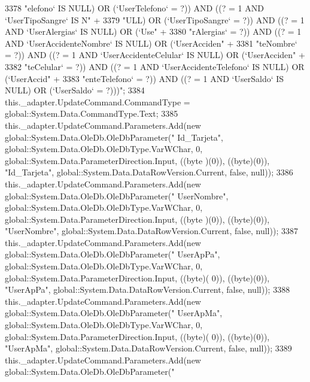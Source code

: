 \begin{DoxyCode}
3378                 \textcolor{stringliteral}{"elefono` IS NULL) OR (`UserTelefono` = ?)) AND ((? = 1 AND `UserTipoSangre` IS N"} +
3379                 \textcolor{stringliteral}{"ULL) OR (`UserTipoSangre` = ?)) AND ((? = 1 AND `UserAlergias` IS NULL) OR (`Use"} +
3380                 \textcolor{stringliteral}{"rAlergias` = ?)) AND ((? = 1 AND `UserAccidenteNombre` IS NULL) OR (`UserAcciden"} +
3381                 \textcolor{stringliteral}{"teNombre` = ?)) AND ((? = 1 AND `UserAccidenteCelular` IS NULL) OR (`UserAcciden"} +
3382                 \textcolor{stringliteral}{"teCelular` = ?)) AND ((? = 1 AND `UserAccidenteTelefono` IS NULL) OR (`UserAccid"} +
3383                 \textcolor{stringliteral}{"enteTelefono` = ?)) AND ((? = 1 AND `UserSaldo` IS NULL) OR (`UserSaldo` = ?)))"};
3384             this.\_adapter.UpdateCommand.CommandType = global::System.Data.CommandType.Text;
3385             this.\_adapter.UpdateCommand.Parameters.Add(\textcolor{keyword}{new} global::System.Data.OleDb.OleDbParameter(\textcolor{stringliteral}{"
      Id\_Tarjeta"}, global::System.Data.OleDb.OleDbType.VarWChar, 0, global::System.Data.ParameterDirection.Input, ((byte
      )(0)), ((byte)(0)), \textcolor{stringliteral}{"Id\_Tarjeta"}, global::System.Data.DataRowVersion.Current, \textcolor{keyword}{false}, null));
3386             this.\_adapter.UpdateCommand.Parameters.Add(\textcolor{keyword}{new} global::System.Data.OleDb.OleDbParameter(\textcolor{stringliteral}{"
      UserNombre"}, global::System.Data.OleDb.OleDbType.VarWChar, 0, global::System.Data.ParameterDirection.Input, ((byte
      )(0)), ((byte)(0)), \textcolor{stringliteral}{"UserNombre"}, global::System.Data.DataRowVersion.Current, \textcolor{keyword}{false}, null));
3387             this.\_adapter.UpdateCommand.Parameters.Add(\textcolor{keyword}{new} global::System.Data.OleDb.OleDbParameter(\textcolor{stringliteral}{"
      UserApPa"}, global::System.Data.OleDb.OleDbType.VarWChar, 0, global::System.Data.ParameterDirection.Input, ((byte)(
      0)), ((byte)(0)), \textcolor{stringliteral}{"UserApPa"}, global::System.Data.DataRowVersion.Current, \textcolor{keyword}{false}, null));
3388             this.\_adapter.UpdateCommand.Parameters.Add(\textcolor{keyword}{new} global::System.Data.OleDb.OleDbParameter(\textcolor{stringliteral}{"
      UserApMa"}, global::System.Data.OleDb.OleDbType.VarWChar, 0, global::System.Data.ParameterDirection.Input, ((byte)(
      0)), ((byte)(0)), \textcolor{stringliteral}{"UserApMa"}, global::System.Data.DataRowVersion.Current, \textcolor{keyword}{false}, null));
3389             this.\_adapter.UpdateCommand.Parameters.Add(\textcolor{keyword}{new} global::System.Data.OleDb.OleDbParameter(\textcolor{stringliteral}{"
}
\end{DoxyCode}
